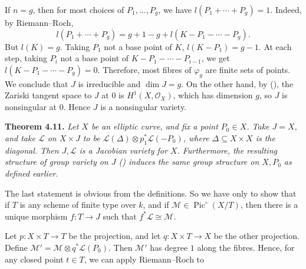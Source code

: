 {If $n=g$, then for most choices of $P_1,\ldots,P_g$, we have $l(P_1+\cdots+P_g)=1$. Indeed, by Riemann--Roch,
\[
l(P_1+\cdots+P_g)=g+1-g+l(K-P_1-\cdots-P_g).
\]
\noindent But $l(K)=g$. Taking $P_1$ not a base point of $K$, $l(K-P_1)=g-1$. At each step, taking $P_i$ not a base point of $K-P_1-\cdots-P_{i-1}$, we get $l(K-P_1-\cdots-P_g)=0$. Therefore, most fibres of $\varphi_g$ are finite sets of points. We conclude that $J$ is irreducible and $\dim J=g$. On the other hand, by (), the Zariski tangent space to $J$ at $0$ is $H^1(X,\mathcal O_X)$, which has dimension $g$, so $J$ is nonsingular at $0$.  Hence $J$ is a nonsingular variety.

\medskip
\noindent\hypertarget{result-IV-4.11}{}\textbf{Theorem 4.11.} \emph{Let $X$ be an elliptic curve, and fix a point $P_0\in X$. Take $J=X$, and take $\mathcal L$ on $X\times J$ to be $\mathcal L(\Delta)\otimes p_1^*\mathcal L(-P_0)$, where $\Delta\subseteq X\times X$ is the diagonal. Then $J,\mathcal L$ is a Jacobian variety for $X$. Furthermore, the resulting structure of group variety on $J$ \textup{()} induces the same group structure on $X,P_0$ as defined earlier.}

\Proof The last statement is obvious from the definitions. So we have only to show that if $T$ is any scheme of finite type over $k$, and if $\mathcal M\in\operatorname{Pic}^{\circ}(X/T)$, then there is a unique morphism $f\colon T\to J$ such that $f^*\mathcal L\cong\mathcal M$.

Let $p\colon X\times T\to T$ be the projection, and let $q\colon X\times T\to X$ be the other projection. Define $\mathcal M'=\mathcal M\otimes q^*\mathcal L(P_0)$. Then $\mathcal M'$ has degree $1$ along the fibres. Hence, for any closed point $t\in T$, we can apply Riemann--Roch to
}
